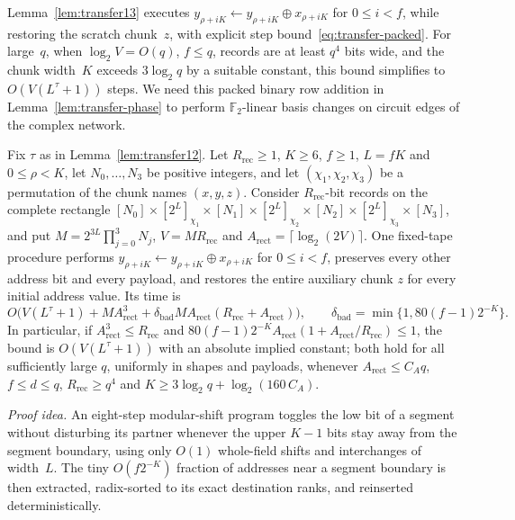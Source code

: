 Lemma~\ref{lem:transfer13} executes $y_{\rho+iK}\leftarrow y_{\rho+iK}\oplus x_{\rho+iK}$ for $0\le i<f$, while restoring the scratch chunk~$z$, with explicit step bound~\eqref{eq:transfer-packed}. For large~$q$, when $\log_2 V=O(q)$, $f\le q$, records are at least $q^4$ bits wide, and the chunk width~$K$ exceeds $3\log_2 q$ by a suitable constant, this bound simplifies to $O(V(L^\tau+1))$ steps. We need this packed binary row addition in Lemma~\ref{lem:transfer-phase} to perform $\mathbb F_2$-linear basis changes on circuit edges of the complex network.

\begin{lemma}\label{lem:transfer13}
Fix $\tau$ as in Lemma~\ref{lem:transfer12}. Let $R_{\mathrm{rec}}\ge1$, $K\ge6$, $f\ge1$, $L=fK$ and $0\le\rho<K$, let
$N_0,\dots,N_3$ be positive integers, and let $(\chi_1,\chi_2,\chi_3)$ be a permutation of the chunk names $(x,y,z)$.
Consider $R_{\mathrm{rec}}$-bit records on the complete rectangle
$[N_0]\times[2^L]_{\chi_1}\times[N_1]\times[2^L]_{\chi_2}\times[N_2]\times[2^L]_{\chi_3}\times[N_3]$, and put
$M=2^{3L}\prod_{j=0}^3N_j$, $V=MR_{\mathrm{rec}}$ and $A_{\mathrm{rect}}=\lceil\log_2(2V)\rceil$. One fixed-tape
procedure performs $y_{\rho+iK}\leftarrow y_{\rho+iK}\oplus x_{\rho+iK}$ for $0\le i<f$, preserves every other address
bit and every payload, and restores the entire auxiliary chunk $z$ for every initial address value. Its time is
\begin{equation}\label{eq:transfer-packed}
  O\bigl(V(L^\tau+1)+MA_{\mathrm{rect}}^3+\delta_{\mathrm{bad}}MA_{\mathrm{rect}}(R_{\mathrm{rec}}+A_{\mathrm{rect}})\bigr),
  \qquad \delta_{\mathrm{bad}}=\min\{1,80(f-1)2^{-K}\}.
\end{equation}
In particular, if $A_{\mathrm{rect}}^3\le R_{\mathrm{rec}}$ and
$80(f-1)2^{-K}A_{\mathrm{rect}}(1+A_{\mathrm{rect}}/R_{\mathrm{rec}})\le1$, the bound is $O(V(L^\tau+1))$ with an
absolute implied constant; both hold for all sufficiently large $q$, uniformly in shapes and payloads, whenever
$A_{\mathrm{rect}}\le C_Aq$, $f\le d\le q$, $R_{\mathrm{rec}}\ge q^4$ and $K\ge3\log_2q+\log_2(160\,C_A)$.
\end{lemma}

\emph{Proof idea.}
An eight-step modular-shift program toggles the low bit of a segment without disturbing its partner whenever the upper $K-1$ bits stay away from the segment boundary, using only $O(1)$ whole-field shifts and interchanges of width~$L$. The tiny $O(f 2^{-K})$ fraction of addresses near a segment boundary is then extracted, radix-sorted to its exact destination ranks, and reinserted deterministically.

